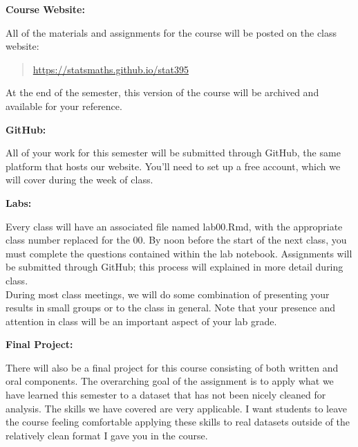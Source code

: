 \documentclass[12pt]{article}
\begin{document}
\vspace{0.4cm}

\textbf{Course Website:} \vspace{6pt}

All of the materials and assignments for the course will be posted
on the class website:
\begin{quote}
\url{https://statsmaths.github.io/stat395}
\end{quote}
At the end of the semester, this version of the course
will be archived and available for your reference.

\vspace{0.4cm}

\textbf{GitHub:} \vspace{6pt}

All of your work for this semester will be submitted through GitHub,
the same platform that hosts our website. You'll need to set up a free
account, which we will cover during the week of class.

\vspace{0.4cm}

\textbf{Labs:} \vspace{6pt}

Every class will
have an associated file named lab00.Rmd, with the appropriate class
number replaced for the 00. By noon before the start of the next
class, you must complete the questions contained within the lab
notebook. Assignments will be submitted through GitHub; this
process will explained in more detail during class. \\

During most class meetings, we will do some combination of presenting
your results in small groups or to the class in general. Note that
your presence and attention in class will be an important aspect
of your lab grade.

\vspace{0.4cm}

\textbf{Final Project:} \vspace{6pt}

There will also be a final project for this course consisting of
both written and oral components. The overarching goal of the assignment
is to apply what we have learned this semester to a dataset
that has not been nicely cleaned for analysis. The skills we have
covered are very applicable. I want students to leave the course feeling
comfortable applying these skills to real datasets outside of the relatively
clean format I gave you in the course.
\end{document}
